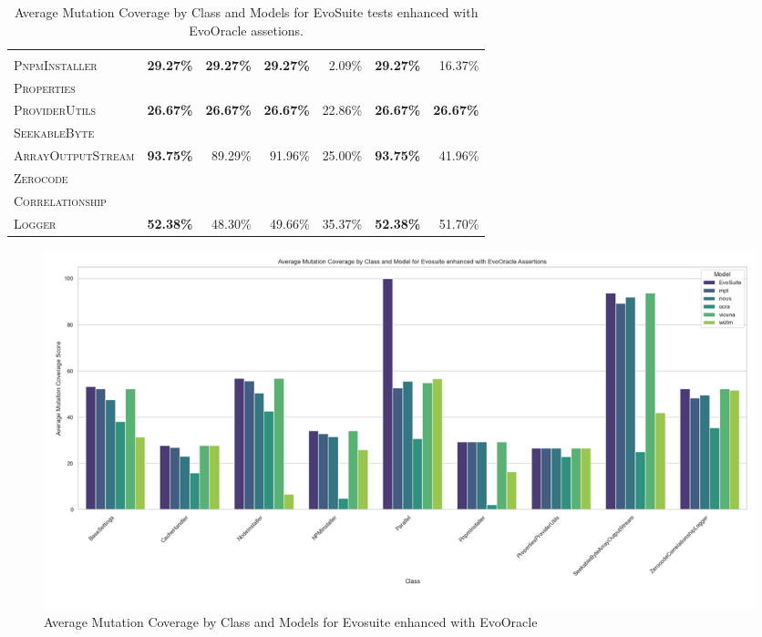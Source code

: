 \begin{table}[H]
\begin{tabular}{| l | r | r | r | r | r | r |}
\hline
\scriptsize\textsc{} &  &  &  &  &  &  \\
\scriptsize\textsc{PnpmInstaller} & \textbf{29.27\%} & \textbf{29.27\%} & \textbf{29.27\%} & 2.09\% & \textbf{29.27\%} & 16.37\%  \\
\hline
\scriptsize\textsc{Properties} &  &  &  &  &  &  \\
\scriptsize\textsc{ProviderUtils} & \textbf{26.67\%} & \textbf{26.67\%} & \textbf{26.67\%} & 22.86\% & \textbf{26.67\%} & \textbf{26.67\%}  \\
\hline
\scriptsize\textsc{SeekableByte} &  &  &  &  &  &  \\
\scriptsize\textsc{ArrayOutputStream} & \textbf{93.75\%} & 89.29\% & 91.96\% & 25.00\% & \textbf{93.75\%} & 41.96\%  \\
\hline
\scriptsize\textsc{Zerocode} &  &  &  &  &  &  \\
\scriptsize\textsc{Correlationship} &  &  &  &  &  &  \\
\scriptsize\textsc{Logger} & \textbf{52.38\%} & 48.30\% & 49.66\% & 35.37\% & \textbf{52.38\%} & 51.70\%  \\
\hline

\end{tabular}
\caption{Average Mutation Coverage by Class and Models for EvoSuite tests enhanced with EvoOracle assetions.\protect\footnotemark}
\label{tab:enhances_mutation_coverage}
\end{table}


\begin{figure}[H]
\centering
\includegraphics[width=1\textwidth]{images/enhanced_mutation_coverage_avg.png}
\caption{Average Mutation Coverage by Class and Models for Evosuite enhanced with EvoOracle}
\label{fig:enhanced_mutation_coverage}
\end{figure}

